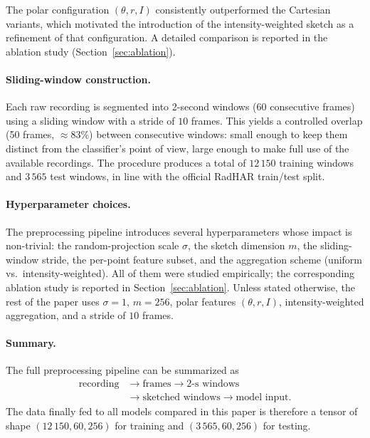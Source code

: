 \documentclass[10pt,twocolumn]{article}
\begin{document}
\noindent The polar configuration $(\theta, r, I)$ consistently
outperformed the Cartesian variants, which motivated the introduction
of the intensity-weighted sketch as a refinement of that
configuration. A detailed comparison is reported in the ablation
study (Section~\ref{sec:ablation}).

\paragraph{Sliding-window construction.}
Each raw recording is segmented into 2-second windows (60 consecutive
frames) using a sliding window with a stride of $10$ frames. This
yields a controlled overlap (50 frames, $\approx 83\%$) between
consecutive windows: small enough to keep them distinct from the
classifier's point of view, large enough to make full use of the
available recordings. The procedure produces a total of $12\,150$
training windows and $3\,565$ test windows, in line with the official
RadHAR train/test split.

\paragraph{Hyperparameter choices.}
The preprocessing pipeline introduces several hyperparameters whose
impact is non-trivial: the random-projection scale $\sigma$, the
sketch dimension $m$, the sliding-window stride, the per-point
feature subset, and the aggregation scheme (uniform vs.\
intensity-weighted). All of them were studied empirically; the
corresponding ablation study is reported in
Section~\ref{sec:ablation}. Unless stated otherwise, the rest of the
paper uses $\sigma = 1$, $m = 256$, polar features
$(\theta, r, I)$, intensity-weighted aggregation, and a stride of
$10$ frames.

\paragraph{Summary.}
The full preprocessing pipeline can be summarized as
\[
\begin{aligned}
\text{recording} &\rightarrow \text{frames}
\rightarrow \text{2-s windows} \\
&\rightarrow \text{sketched windows}
\rightarrow \text{model input.}
\end{aligned}
\]
The data finally fed to all models compared in this paper is therefore
a tensor of shape $(12\,150, 60, 256)$ for training and
$(3\,565, 60, 256)$ for testing.
\end{document}
